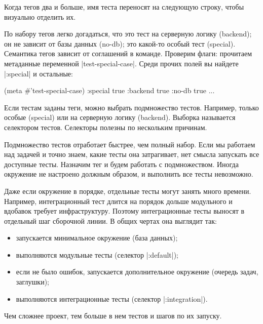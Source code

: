 Когда тегов два и больше, имя теста переносят на следующую строку, чтобы
визуально отделить их.

По набору тегов легко догадаться, что это тест на серверную логику (backend); он
не зависит от базы данных (no-db); это какой-то особый тест (special). Семантика
тегов зависит от соглашений в команде. Проверим флаги: прочитаем метаданные
переменной \spverb|test-special-case|. Среди прочих полей вы найдете
\spverb|:special| и остальные:

\begin{english}
  \begin{clojure}
(meta #'test-special-case)
{:special true :backend true :no-db true ...}
  \end{clojure}
\end{english}

Если тестам заданы теги, можно выбрать подмножество тестов. Например, только
особые (special) или на серверную логику (backend). Выборка называется
селектором тестов. Селекторы полезны по нескольким причинам.

Подмножество тестов отработает быстрее, чем полный набор. Если мы работаем над
задачей и точно знаем, какие тесты она затрагивает, нет смысла запускать все
доступные тесты. Назначим тег и будем работать с подмножеством. Иногда окружение
не настроено должным образом, и выполнить все тесты невозможно.

Даже если окружение в порядке, отдельные тесты могут занять много
времени. Например, интеграционный тест длится на порядок дольше модульного и
вдобавок требует инфраструктуру. Поэтому интеграционные тесты выносят в
отдельный шаг сборочной линии. В общих чертах она выглядит так:

\begin{itemize}

\item
  запускается минимальное окружение (база данных);

\item
  выполняются модульные тесты (селектор \spverb|:default|);

\item
  если не было ошибок, запускается дополнительное окружение (очередь задач, заглушки);

\item
  выполняются интеграционные тесты (селектор \spverb|:integration|).

\end{itemize}

Чем сложнее проект, тем больше в нем тестов и шагов по их запуску.

